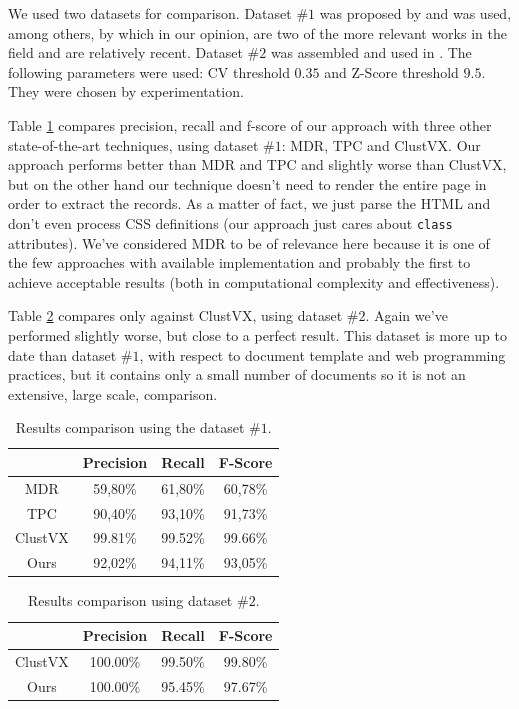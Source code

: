 \documentclass{vldb}
\begin{document}
We used two datasets for comparison. Dataset $\#1$ was proposed by
\cite{yamada2004testbed} and was used, among others, by \cite{TPC09,clustVX2014}
which in our opinion, are two of the more relevant works in the field and are
relatively recent. Dataset $\#2$ was assembled and used in \cite{clustVX2014}.
The following parameters were used: CV threshold $0.35$ and Z-Score threshold
$9.5$. They were chosen by experimentation.

Table \ref{table:compare1} compares precision, recall and f-score of our
approach with three other state-of-the-art techniques, using dataset $\#1$:
MDR\cite{MDR03}, TPC\cite{TPC09} and ClustVX\cite{clustVX2014}.
Our approach performs better than MDR and TPC and slightly worse than ClustVX,
but on the other hand our technique doesn't need to render the entire page in
order to extract the records. As a matter of fact, we just parse the HTML and
don't even process CSS definitions (our approach just cares about \texttt{class}
attributes).
We've considered MDR to be of relevance here because it is one of the few
approaches with available implementation and probably the first to achieve
acceptable results (both in computational complexity and effectiveness).

Table \ref{table:compare2} compares only against ClustVX, using dataset $\#2$.
Again we've performed slightly worse, but close to a perfect result. This
dataset is more up to date than dataset $\#1$, with respect to document
template and web programming practices, but it contains only a small number of
documents so it is not an extensive, large scale, comparison.

\begin{table}[h]
\centering
\caption{Results comparison using the dataset $\#1$.}
\label{table:compare1}
\begin{tabular}
{|c| c| c| c|}\hline
	& Precision	& Recall	& F-Score\\ \hline
MDR\cite{MDR03} &	59,80\%	& 61,80\%	& 60,78\%\\ \hline
TPC\cite{TPC09}	& 90,40\%	& 93,10\%	& 91,73\%\\ \hline
ClustVX\cite{clustVX2014} &	99.81\% & 99.52\% & 99.66\%\\ \hline
Ours &	92,02\%	& 94,11\%	& 93,05\% \\ \hline
\end{tabular}
\end{table}

\begin{table}[h]
\centering
\caption{Results comparison using dataset $\#2$.}
\label{table:compare2}
\begin{tabular}
{|c| c| c| c|}\hline
	& Precision	& Recall	& F-Score\\ \hline
ClustVX\cite{clustVX2014} &	100.00\% & 99.50\% & 99.80\%\\ \hline
Ours &	100.00\% & 95.45\% & 97.67\% \\ \hline
\end{tabular}
\end{table}
\end{document}
